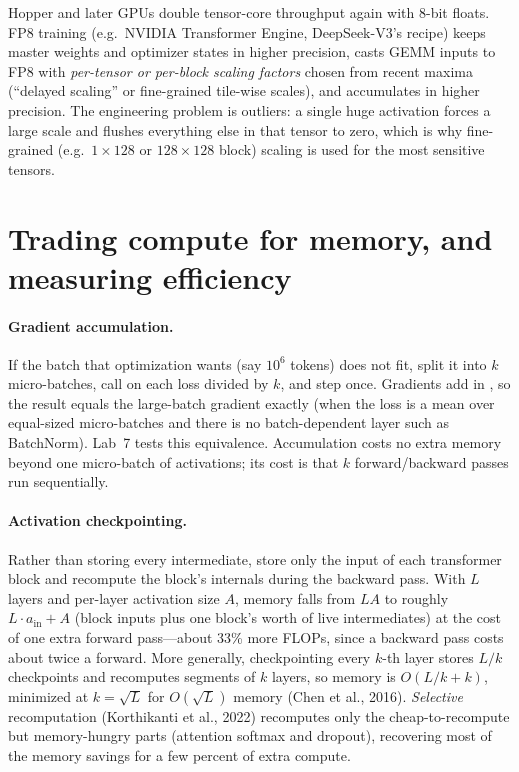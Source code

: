 \begin{systemslens}[FP8 training]
Hopper and later GPUs double tensor-core throughput again with 8-bit floats. FP8 training
(e.g.\ NVIDIA Transformer Engine, DeepSeek-V3's recipe) keeps master weights and optimizer
states in higher precision, casts GEMM inputs to FP8 with \emph{per-tensor or per-block scaling
factors} chosen from recent maxima (``delayed scaling'' or fine-grained tile-wise scales), and
accumulates in higher precision. The engineering problem is outliers: a single huge activation
forces a large scale and flushes everything else in that tensor to zero, which is why
fine-grained (e.g.\ $1\times128$ or $128\times128$ block) scaling is used for the most
sensitive tensors.
\end{systemslens}

\section{Trading compute for memory, and measuring efficiency}\label{sec:pretrain:efficiency}

\paragraph{Gradient accumulation.} If the batch that optimization wants (say $10^6$ tokens) does
not fit, split it into $k$ micro-batches, call  on each loss divided by $k$,
and step once. Gradients add in , so the result equals the large-batch gradient
exactly (when the loss is a mean over equal-sized micro-batches and there is no batch-dependent
layer such as BatchNorm). Lab~7 tests this equivalence. Accumulation costs no extra memory
beyond one micro-batch of activations; its cost is that $k$ forward/backward passes run
sequentially.

\paragraph{Activation checkpointing.} Rather than storing every intermediate, store only the
input of each transformer block and recompute the block's internals during the backward pass.
With $L$ layers and per-layer activation size $A$, memory falls from $LA$ to roughly
$L\cdot a_{\text{in}} + A$ (block inputs plus one block's worth of live intermediates) at the
cost of one extra forward pass---about 33\% more FLOPs, since a backward pass costs about twice
a forward. More generally, checkpointing every $k$-th layer stores $L/k$ checkpoints and
recomputes segments of $k$ layers, so memory is $O(L/k + k)$, minimized at $k=\sqrt L$ for
$O(\sqrt L)$ memory (Chen et al., 2016). \emph{Selective} recomputation (Korthikanti et al.,
2022) recomputes only the cheap-to-recompute but memory-hungry parts (attention softmax and
dropout), recovering most of the memory savings for a few percent of extra compute.

